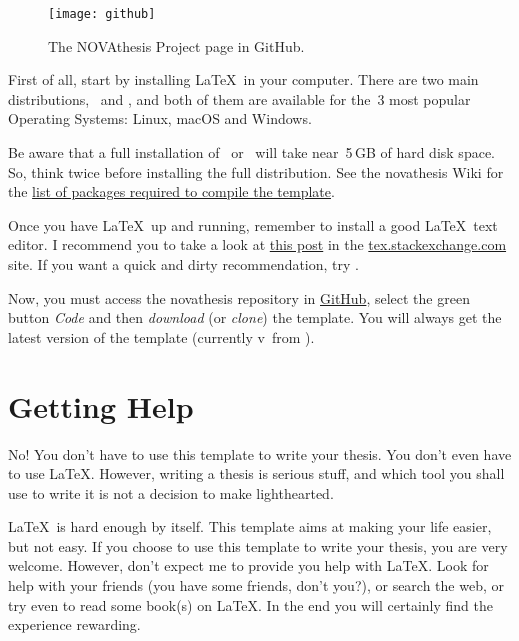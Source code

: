 
\begin{figure}
\vspace*{-17ex}
\texttt{[image: github]}%
\caption{The NOVAthesis Project page in GitHub.}
\label{fig:github2}
\end{figure}

First of all, start by installing \LaTeX\ in your computer.  There are two main distributions, \href{https://miktex.org}{\ntindex{\MikTeX}}\ and \href{https://www.tug.org/texlive/}{\ntindex{\TeXLive}}, and both of them are available for the~3 most popular Operating Systems: Linux, macOS and Windows.

Be aware that a full installation of \MikTeX\ or \TeXLive\ will take near~5\,GB of hard disk space.  So, think twice before installing the full distribution.  See the \gls{novathesis} Wiki for the \href{https://github.com/joaomlourenco/novathesis/wiki/installing-latex#minimal-installation-in-any-of-the-systems-above}{list of packages required to compile the template}.

Once you have \LaTeX\ up and running, remember to install a good \LaTeX\ text editor.  I recommend you to take a look at  \href{https://tex.stackexchange.com/questions/339/latex-editors-ides}{this post} in the \url{tex.stackexchange.com} site.  If you want a quick and dirty recommendation, try \href{https://www.texstudio.org/}{}.

Now, you must access the \gls{novathesis} repository in \href{https://github.com/joaomlourenco/novathesis}{GitHub}, select the green button \emph{Code} and then \emph{download} (or \emph{clone}) the template.  You will always get the latest version of the template (currently v\novathesisversion\ from \novathesisdate).


\section{Getting Help}
\label{sec:getting_help}

\ntindex[Help]{}

No! You don't have to use this template to write your thesis.  You don't even have to use \LaTeX.  However, writing a thesis is serious stuff, and which tool you shall use to write it is not a decision to make lighthearted.

\LaTeX\ is hard enough by itself.  This template aims at making your life easier, but not easy. If you choose to use this template to write your thesis, you are very welcome.  However, don't expect me to provide you help with \LaTeX.  Look for help with your friends (you have some friends, don't you?), or search the web, or try even to read some book(s) on \LaTeX. In the end you will certainly find the experience rewarding.

